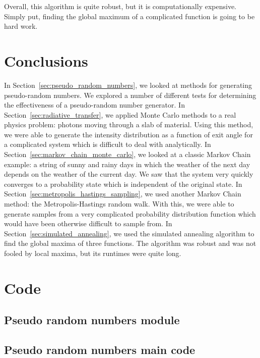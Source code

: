 \documentclass[twocolumn]{myarticle}
\begin{document}
Overall, this algorithm is quite robust, but it is computationally expensive.
Simply put, finding the global maximum of a complicated function is going to be hard work.

\section{Conclusions}
\label{sec:conclusions}

In Section~\ref{sec:pseudo_random_numbers}, we looked at methods for generating pseudo-random numbers.
We explored a number of different tests for determining the effectiveness of a pseudo-random number generator.
In Section~\ref{sec:radiative_transfer}, we applied Monte Carlo methods to a real physics problem: photons moving through a slab of material.
Using this method, we were able to generate the intensity distribution as a function of exit angle for a complicated system which is difficult to deal with analytically.
In Section~\ref{sec:markov_chain_monte_carlo}, we looked at a classic Markov Chain example: a string of sunny and rainy days in which the weather of the next day depends on the weather of the current day.
We saw that the system very quickly converges to a probability state which is independent of the original state.
In Section~\ref{sec:metropolis_hastings_sampling}, we used another Markov Chain method: the Metropolis-Hastings random walk.
With this, we were able to generate samples from a very complicated probability distribution function which would have been otherwise difficult to sample from.
In Section~\ref{sec:simulated_annealing}, we used the simulated annealing algorithm to find the global maxima of three functions.
The algorithm was robust and was not fooled by local maxima, but its runtimes were quite long.

\onecolumn

\section{Code}
\label{sec:code}

\subsection{Pseudo random numbers module}
\label{subsec:pseudo_random_numbers_module}


\vspace{10pt}

\subsection{Pseudo random numbers main code}
\label{subsec:pseudo_random_numbers_main_code}
\end{document}
